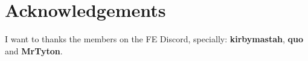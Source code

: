 \documentclass[a4paper]{report}
\begin{document}
\newcommand{\ikef}{\item \ike:}
\newcommand{\oscarf}{\item \oscar:}
\newcommand{\titaniaf}{\item \titania:}
\newcommand{\rhysf}{\item \rhys:}
\newcommand{\gatrief}{\item \gatrie:}
\newcommand{\shinonf}{\item \shinon:}
\newcommand{\sorenf}{\item \soren:}
\newcommand{\boydf}{\item \boyd:}
\newcommand{\miaf}{\item \mia:}
\newcommand{\marciaf}{\item \marcia:}
\newcommand{\volkef}{\item \volke:}
\newcommand{\astridf}{\item \astrid:}
\newcommand{\lethef}{\item \lethe:}
\newcommand{\mordecaif}{\item \mordecai:}
\newcommand{\tanithf}{\item \tanith:}
\newcommand{\reysonf}{\item \reyson:}
\newcommand{\ulkif}{\item \ulki:}
\newcommand{\calillf}{\item \calill:}
\newcommand{\tauroneof}{\item \tauroneo:}
\newcommand{\muarimf}{\item \muarim:}
\newcommand{\largof}{\item \largo:}


\setlength{\columnsep}{.5cm}

\section*{Acknowledgements}

I want to thanks the members on the FE Discord, specially: \textbf{kirbymastah}, \textbf{quo} and \textbf{MrTyton}.



\newpage
\begin{multicols}{2}








\end{multicols}


\begin{multicols}{2}

















\end{multicols}






\end{document}
